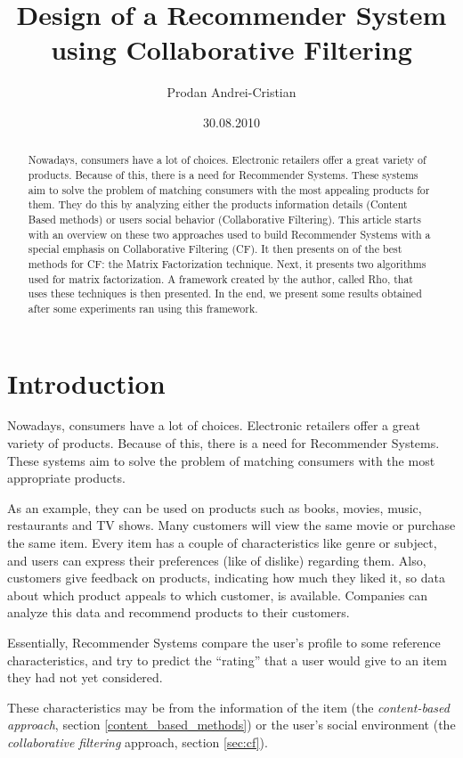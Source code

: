 \documentclass[11pt]{amsart}
\title{Design of a Recommender System using Collaborative Filtering}
\author{Prodan Andrei-Cristian}
\date{30.08.2010} %
\begin{document}
\begin{abstract}
Nowadays, consumers have a lot of choices. Electronic retailers offer a great variety of products. Because of this, there is a need for Recommender Systems. These systems aim to solve the problem of matching consumers with the most appealing products for them. They do this by analyzing either the products information details (Content Based methods) or users social behavior (Collaborative Filtering). This article starts with an overview on these two approaches used to build Recommender Systems with a special emphasis on Collaborative Filtering (CF). It then presents on of the best methods for CF: the Matrix Factorization technique. Next, it presents two algorithms used for matrix factorization. A framework created by the author, called Rho, that uses these techniques is then presented. In the end, we present some results obtained after some experiments ran using this framework.
\end{abstract}

\maketitle

\section{Introduction}

Nowadays, consumers have a lot of choices. Electronic retailers offer a great variety of products. Because of this, there is a need for Recommender Systems. These systems aim to solve the problem of matching consumers with the most appropriate products. 

As an example, they can be used on products such as books, movies, music, restaurants and TV shows. Many customers will view the same movie or purchase the same item. Every item has a couple of characteristics like genre or subject, and users can express their preferences (like of dislike) regarding them. Also, customers give feedback on products, indicating how much they liked it, so data about which product appeals to which customer, is available. Companies can analyze this data and recommend products to their customers.

Essentially, Recommender Systems compare the user's profile to some reference characteristics, and try to predict the ``rating'' that a user would give to an item they had not yet considered.

These characteristics may be from the information of the item (the \emph{content-based approach}, section \ref{content_based_methods}) or the user's social environment (the \emph{collaborative filtering} approach, section \ref{sec:cf}).
\end{document}
